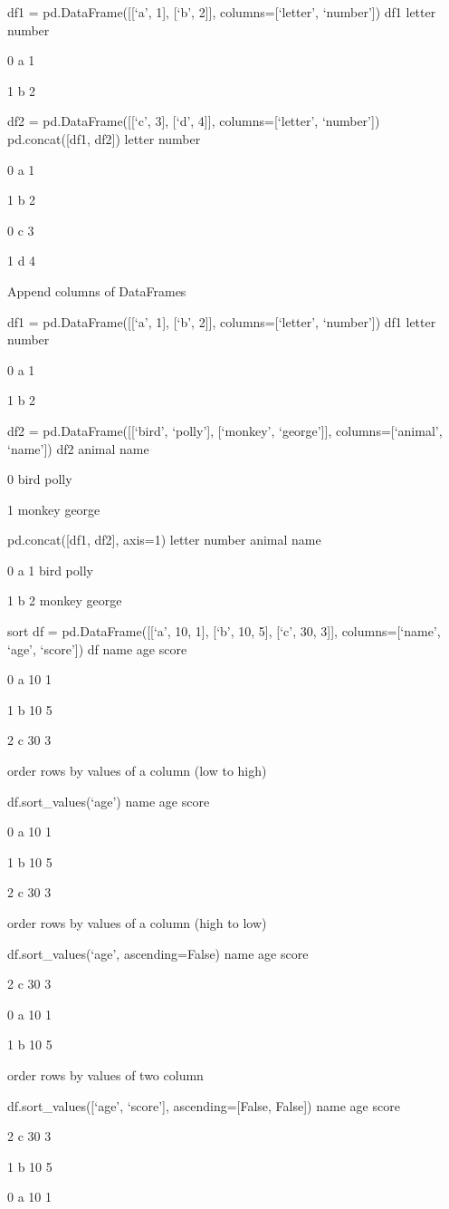 df1 = pd.DataFrame([[‘a’, 1], [‘b’, 2]],
columns=[‘letter’, ‘number’])
df1
letter number

0 a 1

1 b 2

df2 = pd.DataFrame([[‘c’, 3], [‘d’, 4]],
columns=[‘letter’, ‘number’])
pd.concat([df1, df2])
letter number

0 a 1

1 b 2

0 c 3

1 d 4

Append columns of DataFrames

df1 = pd.DataFrame([[‘a’, 1], [‘b’, 2]],
columns=[‘letter’, ‘number’])
df1
letter number

0 a 1

1 b 2

df2 = pd.DataFrame([[‘bird’, ‘polly’], [‘monkey’, ‘george’]],
columns=[‘animal’, ‘name’])
df2
animal name

0 bird polly

1 monkey george

pd.concat([df1, df2], axis=1)
letter number animal name

0 a 1 bird polly

1 b 2 monkey george

sort
df = pd.DataFrame([[‘a’, 10, 1], [‘b’, 10, 5], [‘c’, 30, 3]],
columns=[‘name’, ‘age’, ‘score’])
df
name age score

0 a 10 1

1 b 10 5

2 c 30 3

order rows by values of a column (low to high)

df.sort_values(‘age’)
name age score

0 a 10 1

1 b 10 5

2 c 30 3

order rows by values of a column (high to low)

df.sort_values(‘age’, ascending=False)
name age score

2 c 30 3

0 a 10 1

1 b 10 5

order rows by values of two column

df.sort_values([‘age’, ‘score’], ascending=[False, False])
name age score

2 c 30 3

1 b 10 5

0 a 10 1

